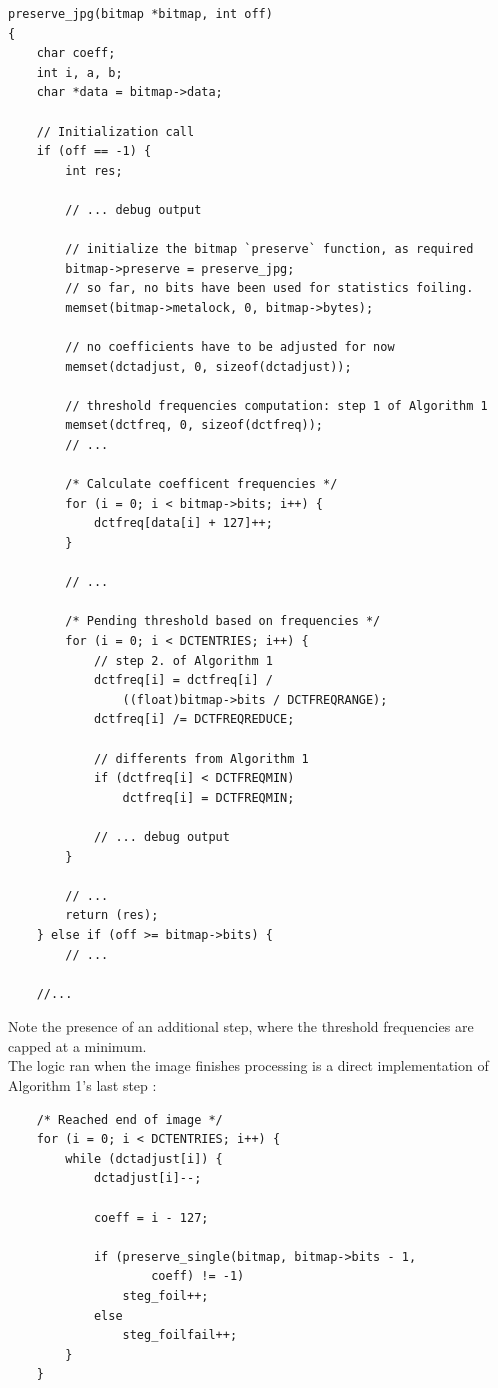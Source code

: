 \documentclass{article}
\begin{document}
\begin{verbatim}
preserve_jpg(bitmap *bitmap, int off)
{
	char coeff;
	int i, a, b;
	char *data = bitmap->data;
	
	// Initialization call
	if (off == -1) {
		int res;
		
		// ... debug output
		
		// initialize the bitmap `preserve` function, as required
		bitmap->preserve = preserve_jpg;
		// so far, no bits have been used for statistics foiling.
		memset(bitmap->metalock, 0, bitmap->bytes);
		
		// no coefficients have to be adjusted for now
		memset(dctadjust, 0, sizeof(dctadjust));

		// threshold frequencies computation: step 1 of Algorithm 1
		memset(dctfreq, 0, sizeof(dctfreq));
		// ...
		
		/* Calculate coefficent frequencies */
		for (i = 0; i < bitmap->bits; i++) {
			dctfreq[data[i] + 127]++;
		}
		
		// ...

		/* Pending threshold based on frequencies */
		for (i = 0; i < DCTENTRIES; i++) {
			// step 2. of Algorithm 1
			dctfreq[i] = dctfreq[i] /
				((float)bitmap->bits / DCTFREQRANGE);
			dctfreq[i] /= DCTFREQREDUCE;

			// differents from Algorithm 1
			if (dctfreq[i] < DCTFREQMIN)
				dctfreq[i] = DCTFREQMIN;
	
			// ... debug output
		}
		
		// ...
		return (res);
	} else if (off >= bitmap->bits) {
		// ...
		
	//...
\end{verbatim}

Note the presence of an additional step, where the threshold frequencies are capped at a minimum. \\

The logic ran when the image finishes processing is a direct implementation of Algorithm 1's last step \cite{def01}:
\begin{verbatim}
	/* Reached end of image */
	for (i = 0; i < DCTENTRIES; i++) {
		while (dctadjust[i]) {
			dctadjust[i]--;
		
			coeff = i - 127;
		
			if (preserve_single(bitmap, bitmap->bits - 1,
					coeff) != -1)
				steg_foil++;
			else
				steg_foilfail++;
		}
	}
\end{verbatim}
\end{document}
